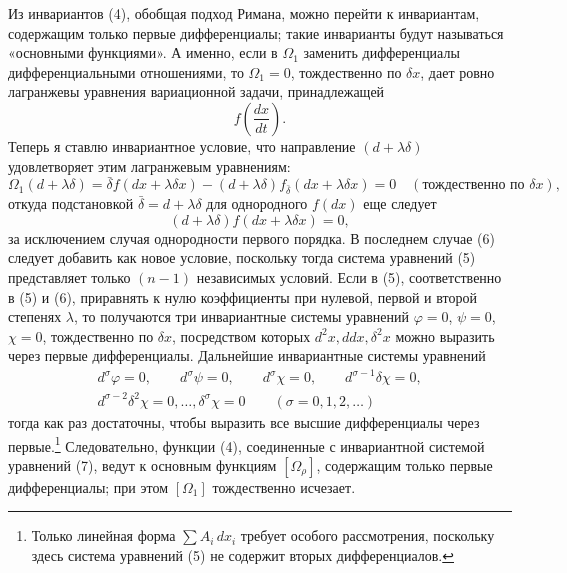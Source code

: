 \documentclass[11pt]{article}
\providecommand{\bdelta}{\bar{\delta}}
\begin{document}
Из инвариантов (4), обобщая подход Римана, можно перейти к инвариантам, содержащим только первые дифференциалы; такие инварианты будут называться «основными функциями». А именно, если в \(\Omega_1\) заменить дифференциалы дифференциальными отношениями, то \(\Omega_1=0\), тождественно по \(\delta x\), дает ровно лагранжевы уравнения вариационной задачи, принадлежащей
\[
f\!\left(\frac{dx}{dt}\right).
\]
Теперь я ставлю инвариантное условие, что направление \((d+\lambda\delta)\) удовлетворяет этим лагранжевым уравнениям:
\begin{equation}
\Omega_1(d+\lambda\delta)=
\bdelta f(dx+\lambda\delta x)
-(d+\lambda\delta)f_{\bdelta}(dx+\lambda\delta x)=0
\quad(\text{тождественно по }\delta x),
\tag{5}
\end{equation}
откуда подстановкой \(\bdelta=d+\lambda\delta\) для однородного \(f(dx)\) еще следует
\begin{equation}
(d+\lambda\delta)f(dx+\lambda\delta x)=0,
\tag{6}
\end{equation}
за исключением случая однородности первого порядка. В последнем случае (6) следует добавить как новое условие, поскольку тогда система уравнений (5) представляет только \((n-1)\) независимых условий. Если в (5), соответственно в (5) и (6), приравнять к нулю коэффициенты при нулевой, первой и второй степенях \(\lambda\), то получаются три инвариантные системы уравнений
\(\varphi=0\), \(\psi=0\), \(\chi=0\), тождественно по \(\delta x\), посредством которых \(d^2x,ddx,\delta^2x\) можно выразить через первые дифференциалы. Дальнейшие инвариантные системы уравнений
\begin{equation}
\begin{gathered}
d^\sigma\varphi=0,\qquad d^\sigma\psi=0,\qquad
d^\sigma\chi=0,\qquad d^{\sigma-1}\delta\chi=0,\\
d^{\sigma-2}\delta^2\chi=0,\ldots,\delta^\sigma\chi=0
\qquad(\sigma=0,1,2,\ldots)
\end{gathered}
\tag{7}
\end{equation}
тогда как раз достаточны, чтобы выразить все высшие дифференциалы через первые.\footnote{Только линейная форма \(\sum A_i\,dx_i\) требует особого рассмотрения, поскольку здесь система уравнений (5) не содержит вторых дифференциалов.} Следовательно, функции (4), соединенные с инвариантной системой уравнений (7), ведут к основным функциям \([\Omega_\rho]\), содержащим только первые дифференциалы; при этом \([\Omega_1]\) тождественно исчезает.
\end{document}
